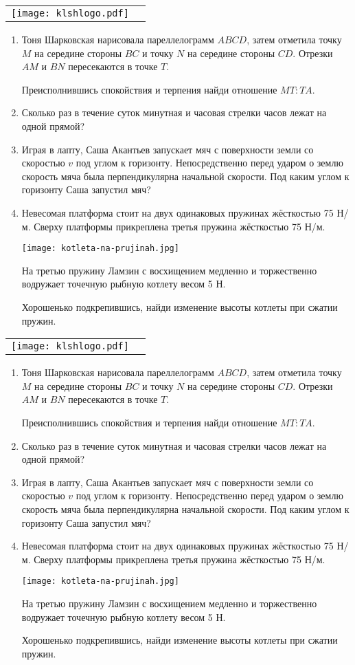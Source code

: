 \documentclass[11pt]{article} %
\newcommand{\tourname}{ФМТ тур 5}
\newcommand{\putlogo}{
\begin{center}
\begin{tabular}{cc}
\texttt{[image: klshlogo.pdf]} &
\raisebox{1cm}{
    {\Large\bf \tourname}
}
\end{tabular}
\end{center}
}
\newcommand{\hardmath}{
Тоня Шарковская нарисовала пареллелограмм $ABCD$, 
затем отметила точку $M$ на середине стороны $BC$ и точку $N$ на середине стороны $CD$. 
Отрезки $AM$ и $BN$ пересекаются в точке $T$.

Преисполнившись спокойствия и терпения найди отношение $MT:TA$.


}
\newcommand{\veryhardmath}{
    Сколько раз в течение суток минутная и часовая стрелки часов лежат на одной прямой?
}
\newcommand{\hardphys}{
    Играя в лапту, Саша Акантьев запускает мяч с поверхности земли со скоростью $v$ под углом к горизонту. 
    Непосредственно перед ударом о землю скорость мяча была перпендикулярна начальной скорости. 
    Под каким углом к горизонту Саша запустил мяч?
}
\newcommand{\veryhardphys}{
Невесомая платформа стоит на двух одинаковых пружинах жёсткостью 75 Н/м. 
Сверху платформы прикреплена третья пружина жёсткостью 75 Н/м. 

\texttt{[image: kotleta-na-prujinah.jpg]}

На третью пружину Ламзин с восхищением медленно и торжественно водружает точечную рыбную котлету весом 5 Н. 

Хорошенько подкрепившись, найди изменение высоты котлеты при сжатии пружин.
}
\begin{document}
\topjudge
\newpage %
\topjudge




\newpage %

\putlogo

\begin{enumerate}
    \item \hardmath
    \item \veryhardmath
    \item \hardphys
    \item \veryhardphys
\end{enumerate}

\vfill

\putlogo

\begin{enumerate}
    \item \hardmath
    \item \veryhardmath
    \item \hardphys
    \item \veryhardphys
\end{enumerate}
\end{document}
